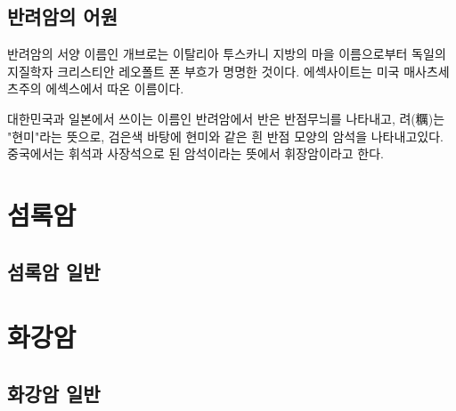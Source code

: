 \documentclass[12pt, a4paper, twoside]{book}
\begin{document}
		
	\section{반려암의 어원}
		반려암의 서양 이름인 개브로는 이탈리아 투스카니 지방의 마을 이름으로부터 독일의 지질학자 크리스티안 레오폴트 폰 부흐가 명명한 것이다. 
		에섹사이트는 미국 매사츠세츠주의 에섹스에서 따온 이름이다.

		대한민국과 일본에서 쓰이는 이름인 반려암에서 반은 반점무늬를 나타내고, 려(糲)는 "현미"라는 뜻으로, 검은색 바탕에 현미와 같은 흰 반점 모양의 암석을 나타내고있다. 
		중국에서는 휘석과 사장석으로 된 암석이라는 뜻에서 휘장암이라고 한다.		

	\clearpage
	\chapter{섬록암}
	\minitoc				%


	\clearpage
	\section{섬록암 일반}






	\clearpage
	\chapter{화강암}
	\minitoc				%


	\clearpage
	\section{화강암 일반}
\end{document}

